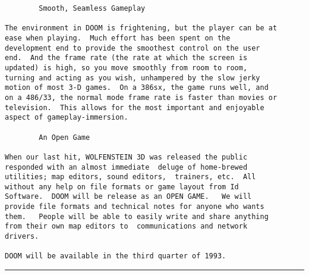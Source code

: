 \begin{verbatim}
        Smooth, Seamless Gameplay

The environment in DOOM is frightening, but the player can be at
ease when playing.  Much effort has been spent on the
development end to provide the smoothest control on the user
end.  And the frame rate (the rate at which the screen is
updated) is high, so you move smoothly from room to room,
turning and acting as you wish, unhampered by the slow jerky
motion of most 3-D games.  On a 386sx, the game runs well, and
on a 486/33, the normal mode frame rate is faster than movies or
television.  This allows for the most important and enjoyable
aspect of gameplay-immersion.

        An Open Game

When our last hit, WOLFENSTEIN 3D was released the public
responded with an almost immediate  deluge of home-brewed
utilities; map editors, sound editors,  trainers, etc.  All
without any help on file formats or game layout from Id
Software.  DOOM will be release as an OPEN GAME.   We will
provide file formats and technical notes for anyone who wants
them.   People will be able to easily write and share anything
from their own map editors to  communications and network
drivers.

DOOM will be available in the third quarter of 1993. 
\end{verbatim}
\par \hrule